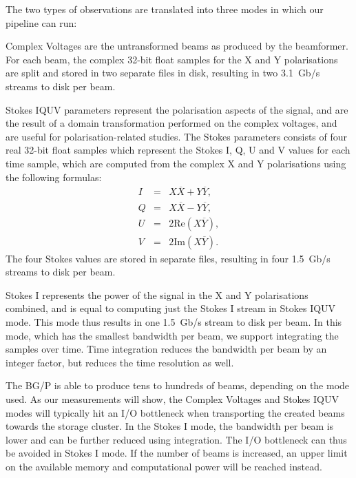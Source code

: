 \documentclass{llncs}
\begin{document}
The two types of observations are translated into three modes in which our pipeline can run:
\begin{description}
\item{Complex Voltages} are the untransformed beams as produced by the beamformer. For each beam, the complex 32-bit float samples for the X and Y polarisations are split and stored in two separate files in disk, resulting in two 3.1~Gb/s streams to disk per beam.
\item{Stokes IQUV} parameters represent the polarisation aspects of the signal, and are the result of a domain transformation performed on the complex voltages, and are useful for polarisation-related studies. The Stokes parameters consists of four real 32-bit float samples which represent the Stokes I, Q, U and V values for each time sample, which are computed from the complex X and Y polarisations using the following formulas:
\begin{eqnarray}
I & = & X\overline{X} + Y\overline{Y}, \\
Q & = & X\overline{X} - Y\overline{Y}, \\
U & = & 2\mathrm{Re}(X\overline{Y}), \\
V & = & 2\mathrm{Im}(X\overline{Y}).
\end{eqnarray}
The four Stokes values are stored in separate files, resulting in four 1.5~Gb/s streams to disk per beam. %
\item{Stokes I} represents the power of the signal in the X and Y polarisations combined, and is equal to computing just the Stokes I stream in Stokes IQUV mode. This mode thus results in one 1.5~Gb/s stream to disk per beam. In this mode, which has the smallest bandwidth per beam, we support integrating the samples over time. Time integration reduces the bandwidth per beam by an integer factor, but reduces the time resolution as well.
\end{description}

The BG/P is able to produce tens to hundreds of beams, depending on the mode used. As our measurements will show, the Complex Voltages and Stokes IQUV modes will typically hit an I/O bottleneck when transporting the created beams towards the storage cluster. In the Stokes I mode, the bandwidth per beam is lower and can be further reduced using integration. The I/O bottleneck can thus be avoided in Stokes I mode. If the number of beams is increased, an upper limit on the available memory and computational power will be reached instead.
\end{document}

